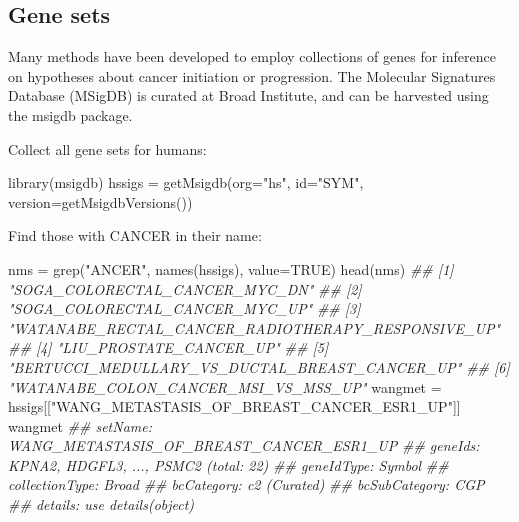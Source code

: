 \documentclass[]{article}
\newcommand{\hlstr}[1]{\textcolor[rgb]{0.251,0.627,0.251}{#1}}%
\newcommand{\hlcom}[1]{\textcolor[rgb]{0.502,0.502,0.502}{\textit{#1}}}%
\newcommand{\hlstd}[1]{\textcolor[rgb]{0.251,0.251,0.251}{#1}}%
\newcommand{\hlkwc}[1]{\textcolor[rgb]{0.251,0.251,0.251}{#1}}%
\newcommand{\hlkwd}[1]{\textcolor[rgb]{0.878,0.439,0.125}{#1}}%
\newenvironment{Shaded}{\begin{myshaded}}{\end{myshaded}}
\newcommand{\KeywordTok}[1]{\hlkwd{#1}}
\newcommand{\DataTypeTok}[1]{\hlkwc{#1}}
\newcommand{\StringTok}[1]{\hlstr{#1}}
\newcommand{\CommentTok}[1]{\hlcom{#1}}
\newcommand{\OtherTok}[1]{{#1}}
\newcommand{\NormalTok}[1]{\hlstd{#1}}
\begin{document}
\hypertarget{gene-sets}{%
\subsection{Gene sets}\label{gene-sets}}

Many methods have been developed to employ collections
of genes for inference on hypotheses about cancer
initiation or progression. The Molecular Signatures Database (MSigDB)
is curated at Broad Institute, and can be harvested
using the msigdb package.

Collect all gene sets for humans:

\begin{Shaded}
\begin{Highlighting}[]
\KeywordTok{library}\NormalTok{(msigdb)}
\NormalTok{hssigs =}\StringTok{ }\KeywordTok{getMsigdb}\NormalTok{(}\DataTypeTok{org=}\StringTok{"hs"}\NormalTok{, }\DataTypeTok{id=}\StringTok{"SYM"}\NormalTok{, }\DataTypeTok{version=}\KeywordTok{getMsigdbVersions}\NormalTok{())}
\end{Highlighting}
\end{Shaded}

Find those with CANCER in their name:

\begin{Shaded}
\begin{Highlighting}[]
\NormalTok{nms =}\StringTok{ }\KeywordTok{grep}\NormalTok{(}\StringTok{"ANCER"}\NormalTok{, }\KeywordTok{names}\NormalTok{(hssigs), }\DataTypeTok{value=}\OtherTok{TRUE}\NormalTok{)}
\KeywordTok{head}\NormalTok{(nms)}
\CommentTok{\#\# [1] "SOGA\_COLORECTAL\_CANCER\_MYC\_DN"                    }
\CommentTok{\#\# [2] "SOGA\_COLORECTAL\_CANCER\_MYC\_UP"                    }
\CommentTok{\#\# [3] "WATANABE\_RECTAL\_CANCER\_RADIOTHERAPY\_RESPONSIVE\_UP"}
\CommentTok{\#\# [4] "LIU\_PROSTATE\_CANCER\_UP"                           }
\CommentTok{\#\# [5] "BERTUCCI\_MEDULLARY\_VS\_DUCTAL\_BREAST\_CANCER\_UP"    }
\CommentTok{\#\# [6] "WATANABE\_COLON\_CANCER\_MSI\_VS\_MSS\_UP"}
\NormalTok{wangmet =}\StringTok{ }\NormalTok{hssigs[[}\StringTok{"WANG\_METASTASIS\_OF\_BREAST\_CANCER\_ESR1\_UP"}\NormalTok{]]}
\NormalTok{wangmet}
\CommentTok{\#\# setName: WANG\_METASTASIS\_OF\_BREAST\_CANCER\_ESR1\_UP }
\CommentTok{\#\# geneIds: KPNA2, HDGFL3, ..., PSMC2 (total: 22)}
\CommentTok{\#\# geneIdType: Symbol}
\CommentTok{\#\# collectionType: Broad}
\CommentTok{\#\#   bcCategory: c2 (Curated)}
\CommentTok{\#\#   bcSubCategory: CGP}
\CommentTok{\#\# details: use \textquotesingle{}details(object)\textquotesingle{}}
\end{Highlighting}
\end{Shaded}
\end{document}
